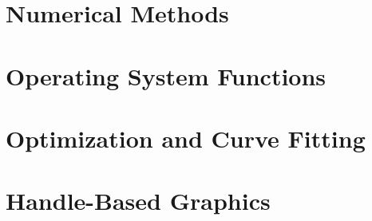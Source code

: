 \documentclass{book}
\begin{document}
\chapter{Numerical Methods}

\chapter{Operating System Functions}














\chapter{Optimization and Curve Fitting}









\chapter{Handle-Based Graphics}















































































\end{document}
